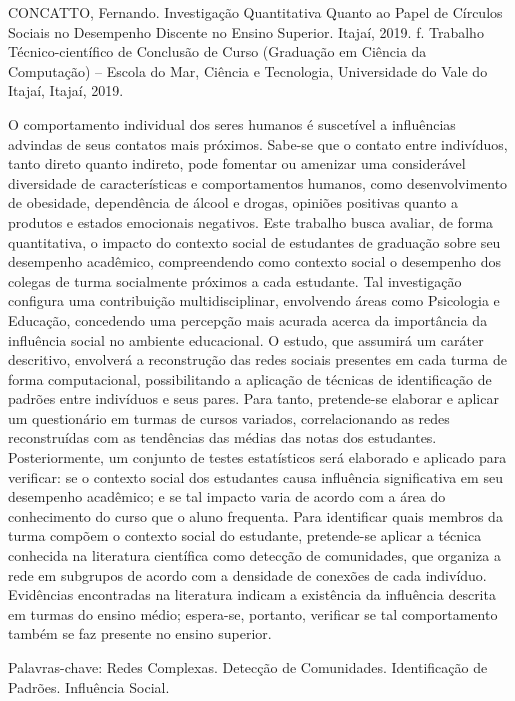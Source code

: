 \begin{Resumo}
CONCATTO, Fernando. Investigação Quantitativa Quanto ao Papel de Círculos Sociais no Desempenho Discente no Ensino Superior. Itajaí, 2019. \pageref{LastPage} f. Trabalho Técnico-científico de Conclusão de Curso (Graduação em Ciência da Computação) -- Escola do Mar, Ciência e Tecnologia, Universidade do Vale do Itajaí, Itajaí, 2019.

O comportamento individual dos seres humanos é suscetível a influências advindas de seus contatos mais próximos. Sabe-se que o contato entre indivíduos, tanto direto quanto indireto, pode fomentar ou amenizar uma considerável diversidade de características e comportamentos humanos, como desenvolvimento de obesidade, dependência de álcool e drogas, opiniões positivas quanto a produtos e estados emocionais negativos. Este trabalho busca avaliar, de forma quantitativa, o impacto do contexto social de estudantes de graduação sobre seu desempenho acadêmico, compreendendo como contexto social o desempenho dos colegas de turma socialmente próximos a cada estudante. Tal investigação configura uma contribuição multidisciplinar, envolvendo áreas como Psicologia e Educação, concedendo uma percepção mais acurada acerca da importância da influência social no ambiente educacional. O estudo, que assumirá um caráter descritivo, envolverá a reconstrução das redes sociais presentes em cada turma de forma computacional, possibilitando a aplicação de técnicas de identificação de padrões entre indivíduos e seus pares. Para tanto, pretende-se elaborar e aplicar um questionário em turmas de cursos variados, correlacionando as redes reconstruídas com as tendências das médias das notas dos estudantes. Posteriormente, um conjunto de testes estatísticos será elaborado e aplicado para verificar: se o contexto social dos estudantes causa influência significativa em seu desempenho acadêmico; e se tal impacto varia de acordo com a área do conhecimento do curso que o aluno frequenta. Para identificar quais membros da turma compõem o contexto social do estudante, pretende-se aplicar a técnica conhecida na literatura científica como detecção de comunidades, que organiza a rede em subgrupos de acordo com a densidade de conexões de cada indivíduo. Evidências encontradas na literatura indicam a existência da influência descrita em turmas do ensino médio; espera-se, portanto, verificar se tal comportamento também se faz presente no ensino superior.

Palavras-chave: Redes Complexas. Detecção de Comunidades. Identificação de Padrões. Influência Social.
\end{Resumo}

